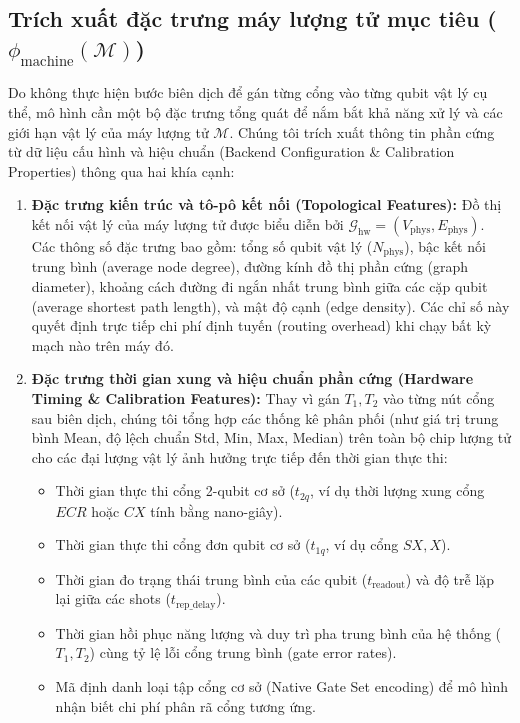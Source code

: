 \documentclass[11pt, a4paper]{article}
\begin{document}
\subsection{Trích xuất đặc trưng máy lượng tử mục tiêu (\texorpdfstring{$\phi_{\text{machine}}(\mathcal{M})$}{phi\_machine(M)})}
Do không thực hiện bước biên dịch để gán từng cổng vào từng qubit vật lý cụ thể, mô hình cần một bộ đặc trưng tổng quát để nắm bắt khả năng xử lý và các giới hạn vật lý của máy lượng tử $\mathcal{M}$. Chúng tôi trích xuất thông tin phần cứng từ dữ liệu cấu hình và hiệu chuẩn (Backend Configuration \& Calibration Properties) thông qua hai khía cạnh:

\begin{enumerate}
    \item \textbf{Đặc trưng kiến trúc và tô-pô kết nối (Topological Features):}
    Đồ thị kết nối vật lý của máy lượng tử được biểu diễn bởi $\mathcal{G}_{\text{hw}} = (V_{\text{phys}}, E_{\text{phys}})$. Các thông số đặc trưng bao gồm: tổng số qubit vật lý ($N_{\text{phys}}$), bậc kết nối trung bình (average node degree), đường kính đồ thị phần cứng (graph diameter), khoảng cách đường đi ngắn nhất trung bình giữa các cặp qubit (average shortest path length), và mật độ cạnh (edge density). Các chỉ số này quyết định trực tiếp chi phí định tuyến (routing overhead) khi chạy bất kỳ mạch nào trên máy đó.
    \item \textbf{Đặc trưng thời gian xung và hiệu chuẩn phần cứng (Hardware Timing \& Calibration Features):}
    Thay vì gán $T_1, T_2$ vào từng nút cổng sau biên dịch, chúng tôi tổng hợp các thống kê phân phối (như giá trị trung bình Mean, độ lệch chuẩn Std, Min, Max, Median) trên toàn bộ chip lượng tử cho các đại lượng vật lý ảnh hưởng trực tiếp đến thời gian thực thi:
    \begin{itemize}
        \item Thời gian thực thi cổng 2-qubit cơ sở ($t_{2q}$, ví dụ thời lượng xung cổng $ECR$ hoặc $CX$ tính bằng nano-giây).
        \item Thời gian thực thi cổng đơn qubit cơ sở ($t_{1q}$, ví dụ cổng $SX, X$).
        \item Thời gian đo trạng thái trung bình của các qubit ($t_{\text{readout}}$) và độ trễ lặp lại giữa các shots ($t_{\text{rep\_delay}}$).
        \item Thời gian hồi phục năng lượng và duy trì pha trung bình của hệ thống ($T_1, T_2$) cùng tỷ lệ lỗi cổng trung bình (gate error rates).
        \item Mã định danh loại tập cổng cơ sở (Native Gate Set encoding) để mô hình nhận biết chi phí phân rã cổng tương ứng.
    \end{itemize}
\end{enumerate}
\end{document}
